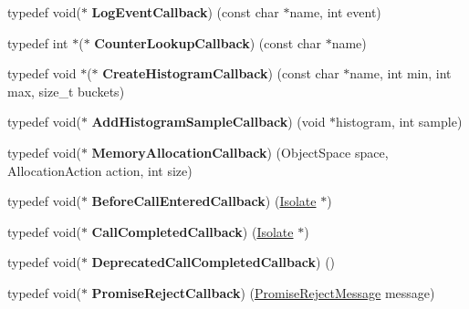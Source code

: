 \begin{DoxyCompactItemize}
\item 
typedef void($\ast$ {\bfseries Log\+Event\+Callback}) (const char $\ast$name, int event)\hypertarget{namespacev8_a1516c6948fdca41f79410b7ff91aeaf0}{}\label{namespacev8_a1516c6948fdca41f79410b7ff91aeaf0}

\item 
typedef int $\ast$($\ast$ {\bfseries Counter\+Lookup\+Callback}) (const char $\ast$name)\hypertarget{namespacev8_a5efca05a9f1f278a4eec832ce419104f}{}\label{namespacev8_a5efca05a9f1f278a4eec832ce419104f}

\item 
typedef void $\ast$($\ast$ {\bfseries Create\+Histogram\+Callback}) (const char $\ast$name, int min, int max, size\+\_\+t buckets)\hypertarget{namespacev8_aafbf15734701792a14c02dbca7535b75}{}\label{namespacev8_aafbf15734701792a14c02dbca7535b75}

\item 
typedef void($\ast$ {\bfseries Add\+Histogram\+Sample\+Callback}) (void $\ast$histogram, int sample)\hypertarget{namespacev8_a5a7c6bb8050ad84f0a453056ec325d1c}{}\label{namespacev8_a5a7c6bb8050ad84f0a453056ec325d1c}

\item 
typedef void($\ast$ {\bfseries Memory\+Allocation\+Callback}) (Object\+Space space, Allocation\+Action action, int size)\hypertarget{namespacev8_a2402a6535cafc5f721192b300502fb0a}{}\label{namespacev8_a2402a6535cafc5f721192b300502fb0a}

\item 
typedef void($\ast$ {\bfseries Before\+Call\+Entered\+Callback}) (\hyperlink{classv8_1_1_isolate}{Isolate} $\ast$)\hypertarget{namespacev8_abe10f58d37b0736a292a6c7f180fb40c}{}\label{namespacev8_abe10f58d37b0736a292a6c7f180fb40c}

\item 
typedef void($\ast$ {\bfseries Call\+Completed\+Callback}) (\hyperlink{classv8_1_1_isolate}{Isolate} $\ast$)\hypertarget{namespacev8_a5003dc8cb6a81f522a9c6b05b98d9e34}{}\label{namespacev8_a5003dc8cb6a81f522a9c6b05b98d9e34}

\item 
typedef void($\ast$ {\bfseries Deprecated\+Call\+Completed\+Callback}) ()\hypertarget{namespacev8_a878e6b3a304e7bcbc155a16fef8400f1}{}\label{namespacev8_a878e6b3a304e7bcbc155a16fef8400f1}

\item 
typedef void($\ast$ {\bfseries Promise\+Reject\+Callback}) (\hyperlink{classv8_1_1_promise_reject_message}{Promise\+Reject\+Message} message)\hypertarget{namespacev8_a3367f6ae375d6d4b4b3f992953c135ba}{}\label{namespacev8_a3367f6ae375d6d4b4b3f992953c135ba}


\end{DoxyCompactItemize}
